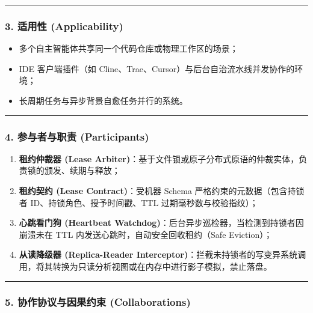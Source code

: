 \documentclass[
]{ctexart}
\providecommand{\tightlist}{%
  \setlength{\itemsep}{0pt}\setlength{\parskip}{0pt}}
\renewcommand{\_}{\discretionary{}{}{\textunderscore}}
\begin{document}
\begin{center}\rule{0.5\linewidth}{0.5pt}\end{center}

\subsubsection{3. 适用性
(Applicability)}\label{ux9002ux7528ux6027-applicability-9}

\begin{itemize}
\tightlist
\item
  多个自主智能体共享同一个代码仓库或物理工作区的场景；
\item
  IDE 客户端插件（如
  Cline、Trae、Cursor）与后台自治流水线并发协作的环境；
\item
  长周期任务与异步背景自愈任务并行的系统。
\end{itemize}

\begin{center}\rule{0.5\linewidth}{0.5pt}\end{center}

\subsubsection{4. 参与者与职责
(Participants)}\label{ux53c2ux4e0eux8005ux4e0eux804cux8d23-participants-9}

\begin{enumerate}
\def\labelenumi{\arabic{enumi}.}
\tightlist
\item
  \textbf{租约仲裁器 (Lease
  Arbiter)}：基于文件锁或原子分布式原语的仲裁实体，负责锁的颁发、续期与释放；
\item
  \textbf{租约契约 (Lease Contract)}：受机器 Schema
  严格约束的元数据（包含持锁者 ID、持锁角色、授予时间戳、TTL
  过期毫秒数与校验指纹）；
\item
  \textbf{心跳看门狗 (Heartbeat
  Watchdog)}：后台异步巡检器，当检测到持锁者因崩溃未在 TTL
  内发送心跳时，自动安全回收租约（Safe Eviction）；
\item
  \textbf{从读降级器 (Replica-Reader
  Interceptor)}：拦截未持锁者的写变异系统调用，将其转换为只读分析视图或在内存中进行影子模拟，禁止落盘。
\end{enumerate}

\begin{center}\rule{0.5\linewidth}{0.5pt}\end{center}

\subsubsection{5. 协作协议与因果约束
(Collaborations)}\label{ux534fux4f5cux534fux8baeux4e0eux56e0ux679cux7ea6ux675f-collaborations-6}
\end{document}
